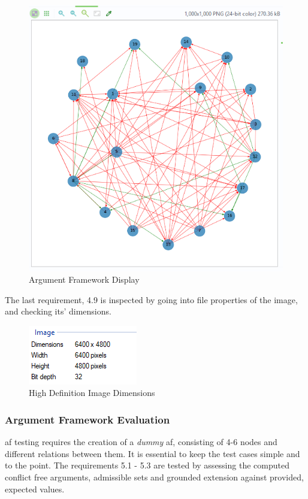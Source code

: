             \begin{figure}[!htbp]
                \centering
                \includegraphics[scale=0.6]{img/display_argument_framework.png}
                \caption{Argument Framework Display}
                \label{fig:displaygraph}
            \end{figure}
            \FloatBarrier
            
            The last requirement, 4.9 is inspected by going into file properties of the image, and checking its' dimensions.
            
            \begin{figure}[!htbp]
                \centering
                \includegraphics[]{img/high_definition_image_req.png}
                \caption{High Definition Image Dimensions}
                \label{fig:highdef}
            \end{figure}
            \FloatBarrier
            
        \subsubsection{Argument Framework Evaluation} \label{afeval}
            \gls{af} testing requires the creation of a \textit{dummy} \gls{af}, consisting of 4-6 nodes and different relations between them. It is essential to keep the test cases simple and to the point. The requirements 5.1 - 5.3 are tested by assessing the computed conflict free arguments, admissible sets and grounded extension against provided, expected values.
            
